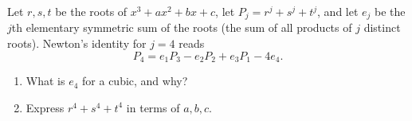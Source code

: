 Let $r,s,t$ be the roots of $x^3+ax^2+bx+c$, let $P_j=r^j+s^j+t^j$, and let $e_j$ be the $j$th elementary symmetric sum of the roots (the sum of all products of $j$ distinct roots). Newton's identity for $j=4$ reads
\[P_4=e_1P_3-e_2P_2+e_3P_1-4e_4.\]
\begin{enumerate}
\item[(a)] What is $e_4$ for a cubic, and why?
\item[(b)] Express $r^4+s^4+t^4$ in terms of $a,b,c$.
\end{enumerate}
